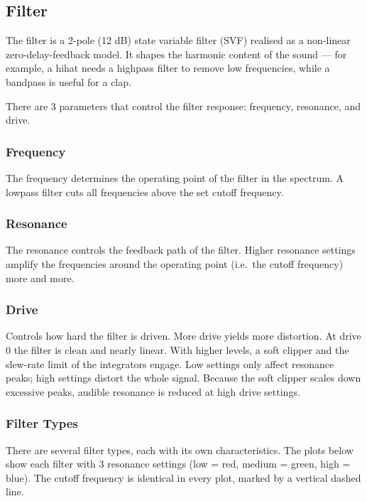 \subsection{Filter}\label{filter}

The filter is a 2-pole (12 dB) state variable filter (SVF) realised as a
non-linear zero-delay-feedback model. It shapes the harmonic content of
the sound --- for example, a hihat needs a highpass filter to remove low
frequencies, while a bandpass is useful for a clap.

There are 3 parameters that control the filter response: frequency,
resonance, and drive.

\subsubsection{Frequency}\label{frequency}

The frequency determines the operating point of the filter in the
spectrum. A lowpass filter cuts all frequencies above the set cutoff
frequency.

\subsubsection{Resonance}\label{resonance}

The resonance controls the feedback path of the filter. Higher resonance
settings amplify the frequencies around the operating point (i.e.~the
cutoff frequency) more and more.

\subsubsection{Drive}\label{drive}

Controls how hard the filter is driven. More drive yields more
distortion. At drive 0 the filter is clean and nearly linear. With
higher levels, a soft clipper and the slew-rate limit of the integrators
engage. Low settings only affect resonance peaks; high settings distort
the whole signal. Because the soft clipper scales down excessive peaks,
audible resonance is reduced at high drive settings.

\subsubsection{Filter Types}\label{filter-types}

There are several filter types, each with its own characteristics. The
plots below show each filter with 3 resonance settings (low = red,
medium = green, high = blue). The cutoff frequency is identical in every
plot, marked by a vertical dashed line.

